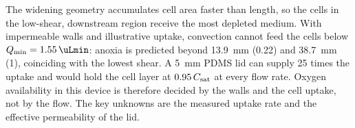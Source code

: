 \begin{keybox}[Answer to RQ4--RQ5]
The widening geometry accumulates cell area faster than length, so the cells in the low-shear, downstream region receive the most depleted medium. With impermeable walls and illustrative uptake, convection cannot feed the cells below $Q_{\min}=\SI{1.55}{\uLmin}$: anoxia is predicted beyond \SI{13.9}{mm} (\SI{0.22}{\uLmin}) and \SI{38.7}{mm} (\SI{1}{\uLmin}), coinciding with the lowest shear. A \SI{5}{mm} PDMS lid can supply 25 times the uptake and would hold the cell layer at $0.95\,C_{\mathrm{sat}}$ at every flow rate. Oxygen availability in this device is therefore decided by the walls and the cell uptake, not by the flow. The key unknowns are the measured uptake rate and the effective permeability of the lid.
\end{keybox}
